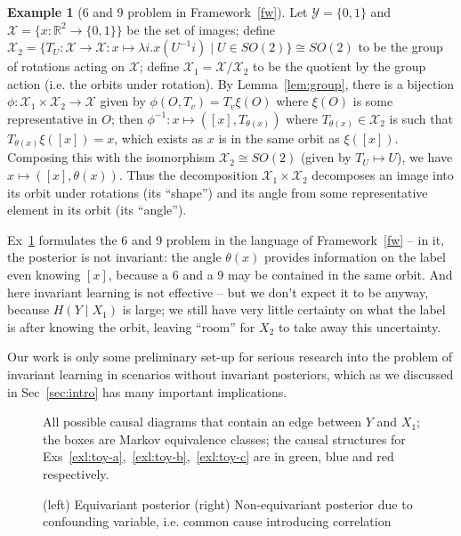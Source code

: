 \documentclass[12pt]{article}
\newcommand{\R}{\mathbb{R}}
\theoremstyle{definition}
\newtheorem{exl}[thm]{Example}
\numberwithin{equation}{section}
\numberwithin{figure}{section}
\numberwithin{table}{section}
\begin{document}
\begin{exl}[6 and 9 problem in Framework~\ref{fw}]
    \label{exl:69}
    Let $\mathcal{Y}=\{0, 1\}$ and $\mathcal{X}=\{x:\R^2\to\{0,1\}\}$ be the set of images; define $\mathcal{X}_2=\{T_U:\mathcal{X}\to\mathcal{X}:x\mapsto\lambda i. x(U^{-1}i)\mid U\in SO(2)\} \cong SO(2)$ to be the group of rotations acting on $\mathcal{X}$; define $\mathcal{X}_1=\mathcal{X}/\mathcal{X}_2$ to be the quotient by the group action (i.e. the orbits under rotation). By Lemma~\ref{lem:group}, there is a bijection $\phi:\mathcal{X}_1\times \mathcal{X}_2\to \mathcal{X}$ given by $\phi(O, T_v)=T_v\xi(O)$ where $\xi(O)$ is some representative in $O$; then $\phi^{-1}:x\mapsto ([x], T_{\theta(x)})$ where $T_{\theta(x)}\in\mathcal{X}_2$ is such that $T_{\theta(x)}\xi([x])=x$, which exists as $x$ is in the same orbit as $\xi([x])$. Composing this with the isomorphism $\mathcal{X}_2\cong SO(2)$ (given by $T_U\mapsto U$), we have $x\mapsto([x],\theta(x))$. Thus the decomposition $\mathcal{X}_1\times\mathcal{X}_2$ decomposes an image into its orbit under rotations (its ``shape'') and its angle from some representative element in its orbit (its ``angle'').
\end{exl} 

Ex~\ref{exl:69} formulates the 6 and 9 problem in the language of Framework~\ref{fw} -- in it, the posterior is not invariant: the angle $\theta(x)$ provides information on the label even knowing $[x]$, because a 6 and a 9 may be contained in the same orbit. And here invariant learning is not effective -- but we don't expect it to be anyway, because $H(Y\mid X_1)$ is large; we still have very little certainty on what the label is after knowing the orbit, leaving ``room'' for $X_2$ to take away this uncertainty. 

Our work is only some preliminary set-up for serious research into the problem of invariant learning in scenarios without invariant posteriors, which as we discussed in Sec~\ref{sec:intro} has many important implications. 

\begin{figure}
    \centering
    
    \caption{All possible causal diagrams that contain an edge between $Y$ and $X_1$; the boxes are Markov equivalence classes; the causal structures for Exs~\ref{exl:toy-a},~\ref{exl:toy-b},~\ref{exl:toy-c} are in green, blue and red respectively.}
    \label{fig:exls}
\end{figure}

\begin{figure}
    \centering
    
    \caption{(left) Equivariant posterior (right) Non-equivariant posterior due to confounding variable, i.e. common cause introducing correlation}
    \label{fig:equivariant}
\end{figure}
\end{document}
